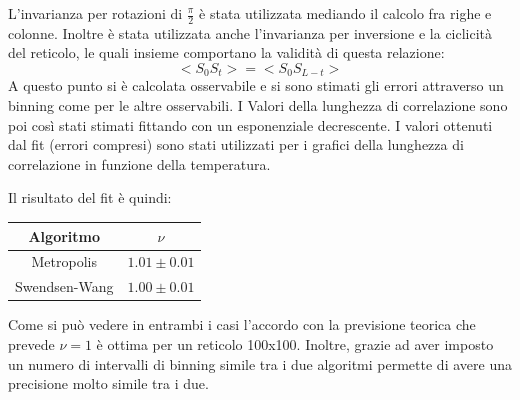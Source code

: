L'invarianza per rotazioni di $\frac{\pi}{2}$ è stata utilizzata mediando il calcolo fra righe e colonne. Inoltre è stata utilizzata anche l'invarianza per inversione  e la ciclicità del reticolo, le quali insieme comportano la validità di questa relazione:
$$
	< S_0 S_t> = < S_0 S_{L-t}>
$$
A questo punto si è calcolata osservabile e si sono stimati gli errori attraverso un binning come per le altre osservabili.
I Valori della lunghezza di correlazione sono poi così stati stimati fittando con un esponenziale decrescente. I valori ottenuti dal fit (errori compresi) sono stati utilizzati per i grafici della lunghezza di correlazione in funzione della temperatura.

Il risultato del fit è quindi:
\begin{center}
	\begin{tabular}{cc}
	\toprule
	Algoritmo & $\nu$ \\
	\midrule
	Metropolis & $ 1.01 \pm 0.01 $\\
	Swendsen-Wang	& $ 1.00 \pm 0.01 $\\
	\bottomrule
	\end{tabular}
\end{center}

Come si può vedere in entrambi i casi l'accordo con la previsione teorica che prevede $\nu = 1$ è ottima per un reticolo 100x100. Inoltre, grazie ad aver imposto un numero di intervalli di binning simile tra i due algoritmi permette di avere una precisione molto simile tra i due.

\newpage
